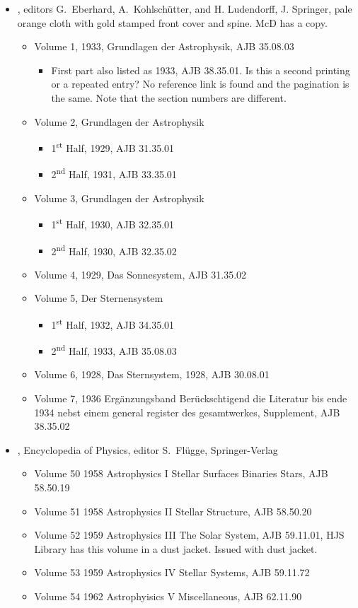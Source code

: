\begin{itemize}
\item {}, editors G.\ Eberhard,
  A.\ Kohlschütter, and H. Ludendorff, J. Springer, pale orange
  cloth with gold stamped front cover and spine. McD has a copy.
  \begin{itemize}
  \item Volume 1, 1933, Grundlagen der Astrophysik, AJB 35.08.03
    \begin{itemize}
    \item First part also listed as 1933, AJB 38.35.01. Is this a
      second printing or a repeated entry?  No reference link is found
      and the pagination is the same. Note that the section numbers
      are different.
      \end{itemize}
  \item Volume 2, Grundlagen der Astrophysik
    \begin{itemize}
    \item 1\textsuperscript{st} Half, 1929, AJB 31.35.01
    \item 2\textsuperscript{nd} Half, 1931, AJB 33.35.01
    \end{itemize}
  \item Volume 3, Grundlagen der Astrophysik
    \begin{itemize}
    \item 1\textsuperscript{st} Half, 1930, AJB 32.35.01
    \item 2\textsuperscript{nd} Half, 1930, AJB 32.35.02
    \end{itemize}
  \item Volume 4, 1929,  Das Sonnesystem, AJB 31.35.02
  \item Volume 5, Der Sternensystem
    \begin{itemize}
    \item 1\textsuperscript{st} Half, 1932, AJB 34.35.01
    \item 2\textsuperscript{nd} Half, 1933, AJB 35.08.03
    \end{itemize}
  \item Volume 6, 1928, Das Sternsystem, 1928, AJB 30.08.01
  \item Volume 7, 1936 Erg\"{a}nzungsband Ber\"{u}ckschtigend die
    Literatur bis ende 1934 nebst einem general register des
    gesamtwerkes, Supplement, AJB 38.35.02
  \end{itemize}

\item {}, Encyclopedia of Physics, editor
  S.\ Fl\"{u}gge, Springer-Verlag
  \begin{itemize}
  \item Volume 50 1958 Astrophysics I Stellar Surfaces Binaries Stars,
    AJB 58.50.19
  \item Volume 51 1958 Astrophysics II Stellar Structure, AJB 58.50.20
  \item Volume 52 1959 Astrophysics III The Solar System, AJB
    59.11.01, HJS Library has this volume in a dust jacket. Issued
    with dust jacket.
  \item Volume 53 1959 Astrophysics IV Stellar Systems, AJB 59.11.72
  \item Volume 54 1962 Astrophyisics V Miscellaneous, AJB 62.11.90


\end{itemize}
\end{itemize}
